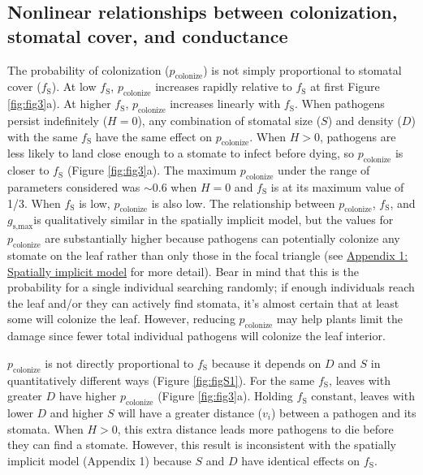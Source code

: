 \documentclass[utf8]{frontiersSCNS}
\newcommand{\fs}{$f_\text{S}$}
\newcommand{\gsmax}{$g_\text{s,max}$}
\begin{document}
\hypertarget{nonlinear-relationships-between-colonization-stomatal-cover-and-conductance}{%
\subsection*{Nonlinear relationships between colonization, stomatal
cover, and
conductance}\label{nonlinear-relationships-between-colonization-stomatal-cover-and-conductance}}

The probability of colonization (\(p_\text{colonize}\)) is not simply
proportional to stomatal cover (\fs). At low \fs, \(p_\text{colonize}\)
increases rapidly relative to \fs{} at first Figure \ref{fig:fig3}a). At
higher \fs, \(p_\text{colonize}\) increases linearly with \fs. When
pathogens persist indefinitely (\(H = 0\)), any combination of stomatal
size (\(S\)) and density (\(D\)) with the same \fs{} have the same
effect on \(p_\text{colonize}\). When \(H > 0\), pathogens are less
likely to land close enough to a stomate to infect before dying, so
\(p_\text{colonize}\) is closer to \fs{} (Figure \ref{fig:fig3}a). The
maximum \(p_\text{colonize}\) under the range of parameters considered
was \(\sim 0.6\) when \(H = 0\) and \fs{} is at its maximum value of
1/3. When \fs{} is low, \(p_\text{colonize}\) is also low. The
relationship between \(p_\text{colonize}\), \fs, and \gsmax is
qualitatively similar in the spatially implicit model, but the values
for \(p_\text{colonize}\) are substantially higher because pathogens can
potentially colonize any stomate on the leaf rather than only those in
the focal triangle (see
\protect\hyperlink{appendix-1-spatially-implicit-model}{Appendix 1:
Spatially implicit model} for more detail). Bear in mind that this is
the probability for a single individual searching randomly; if enough
individuals reach the leaf and/or they can actively find stomata, it's
almost certain that at least some will colonize the leaf. However,
reducing \(p_\text{colonize}\) may help plants limit the damage since
fewer total individual pathogens will colonize the leaf interior.

\(p_\text{colonize}\) is not directly proportional to \fs{} because it
depends on \(D\) and \(S\) in quantitatively different ways (Figure
\ref{fig:figS1}). For the same \fs, leaves with greater \(D\) have
higher \(p_\text{colonize}\) (Figure \ref{fig:fig3}a). Holding \fs{}
constant, leaves with lower \(D\) and higher \(S\) will have a greater
distance (\(v_i\)) between a pathogen and its stomata. When \(H > 0\),
this extra distance leads more pathogens to die before they can find a
stomate. However, this result is inconsistent with the spatially
implicit model (Appendix 1) because \(S\) and \(D\) have identical
effects on \fs.
\end{document}
